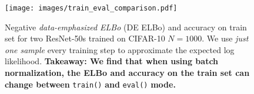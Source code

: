 \begin{figure}[htbp!]
  \centering
  \texttt{[image: images/train\_eval\_comparison.pdf]}
  \caption{Negative \emph{data-emphasized ELBo} (DE ELBo) and accuracy on train set for two ResNet-50s trained on CIFAR-10 $N=1000$. We use \emph{just one sample} every training step to approximate the expected log likelihood. \textbf{Takeaway: We find that when using batch normalization, the ELBo and accuracy on the train set can change between} \texttt{train()} \textbf{and} \texttt{eval()} \textbf{mode.}}
  \label{fig:train_eval_comparison}
\end{figure}
